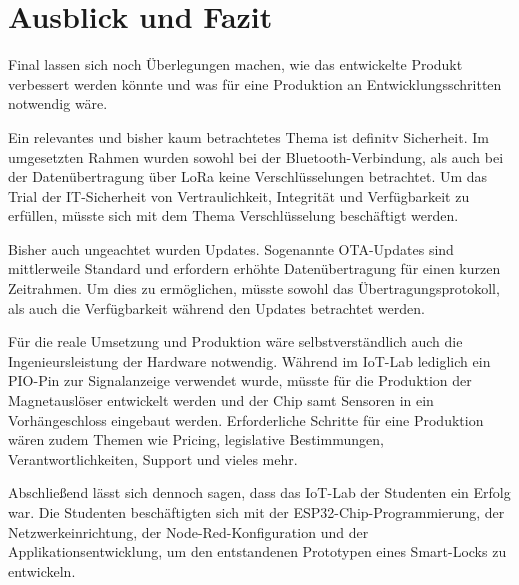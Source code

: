 
\chapter{Ausblick und Fazit}
Final lassen sich noch Überlegungen machen, wie das entwickelte Produkt verbessert werden könnte und was für eine Produktion an Entwicklungsschritten notwendig wäre.

Ein relevantes und bisher kaum betrachtetes Thema ist definitv Sicherheit. Im umgesetzten Rahmen wurden sowohl bei der Bluetooth-Verbindung, als auch bei der Datenübertragung über LoRa keine Verschlüsselungen betrachtet. Um das Trial der IT-Sicherheit von Vertraulichkeit, Integrität und Verfügbarkeit zu erfüllen, müsste sich mit dem Thema Verschlüsselung beschäftigt werden.

Bisher auch ungeachtet wurden Updates. Sogenannte \ac{OTA}-Updates sind mittlerweile Standard und erfordern erhöhte Datenübertragung für einen kurzen Zeitrahmen. Um dies zu ermöglichen, müsste sowohl das Übertragungsprotokoll, als auch die Verfügbarkeit während den Updates betrachtet werden.

Für die reale Umsetzung und Produktion wäre selbstverständlich auch die Ingenieursleistung der Hardware notwendig. Während im \ac{IoT}-Lab lediglich ein \ac{PIO}-Pin zur Signalanzeige verwendet wurde, müsste für die Produktion der Magnetauslöser entwickelt werden und der Chip samt Sensoren in ein Vorhängeschloss eingebaut werden. Erforderliche Schritte für eine Produktion wären zudem Themen wie Pricing, legislative Bestimmungen, Verantwortlichkeiten, Support und vieles mehr.

Abschließend lässt sich dennoch sagen, dass das \ac{IoT}-Lab der Studenten ein Erfolg war. Die Studenten beschäftigten sich mit der ESP32-Chip-Programmierung, der Netzwerkeinrichtung, der Node-Red-Konfiguration und der Applikationsentwicklung, um den entstandenen Prototypen eines Smart-Locks zu entwickeln.